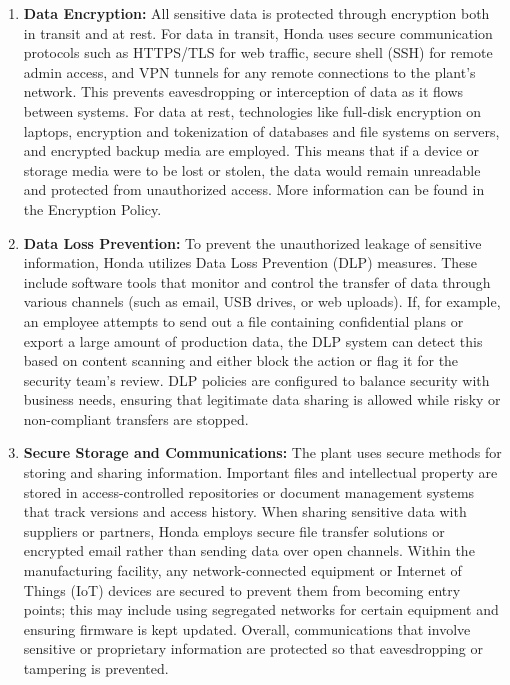 \begin{enumerate}
    \item \textbf{Data Encryption:} All sensitive data is protected through encryption both in transit and at rest. For data in transit, Honda uses secure communication protocols such as HTTPS/TLS for web traffic, secure shell (SSH) for remote admin access, and VPN tunnels for any remote connections to the plant’s network. This prevents eavesdropping or interception of data as it flows between systems. For data at rest, technologies like full-disk encryption on laptops, encryption and tokenization of databases and file systems on servers, and encrypted backup media are employed. This means that if a device or storage media were to be lost or stolen, the data would remain unreadable and protected from unauthorized access. More information can be found in the Encryption Policy.
    \item \textbf{Data Loss Prevention:} To prevent the unauthorized leakage of sensitive information, Honda utilizes Data Loss Prevention (DLP) measures. These include software tools that monitor and control the transfer of data through various channels (such as email, USB drives, or web uploads). If, for example, an employee attempts to send out a file containing confidential plans or export a large amount of production data, the DLP system can detect this based on content scanning and either block the action or flag it for the security team’s review. DLP policies are configured to balance security with business needs, ensuring that legitimate data sharing is allowed while risky or non-compliant transfers are stopped.
    \item \textbf{Secure Storage and Communications:} The plant uses secure methods for storing and sharing information. Important files and intellectual property are stored in access-controlled repositories or document management systems that track versions and access history. When sharing sensitive data with suppliers or partners, Honda employs secure file transfer solutions or encrypted email rather than sending data over open channels. Within the manufacturing facility, any network-connected equipment or Internet of Things (IoT) devices are secured to prevent them from becoming entry points; this may include using segregated networks for certain equipment and ensuring firmware is kept updated. Overall, communications that involve sensitive or proprietary information are protected so that eavesdropping or tampering is prevented.

\end{enumerate}
